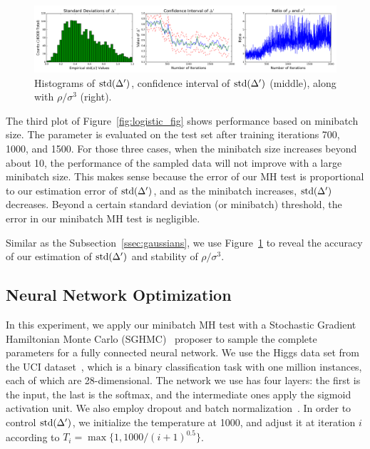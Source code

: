 \documentclass{article}
\begin{document}
\begin{figure}[t]
    \centering
    \includegraphics[width=1\linewidth]{CI_v02.png}
    \caption{
    Histograms of ${\rm std}(\Delta')$, confidence interval of ${\rm std}(\Delta')$ (middle), along with $\rho / \sigma^3$ (right).
    }
    \label{fig:exp_3}
\end{figure}

The third plot of Figure~\ref{fig:logistic_fig} shows performance based on minibatch size. The
parameter is evaluated on the test set after training iterations 700, 1000, and 1500. For those
three cases, when the minibatch size increases beyond about 10, the performance of the sampled data
will not improve with a large minibatch size. This makes sense because the error of our MH test is
proportional to our estimation error of ${\rm std}(\Delta')$, and as the minibatch increases, ${\rm
std}(\Delta')$ decreases. Beyond a certain standard deviation (or minibatch) threshold, the error in
our minibatch MH test is negligible.

Similar as the Subsection~\ref{ssec:gaussians}, we use Figure~\ref{fig:exp_3} to reveal the accuracy of our estimation of ${\rm std}(\Delta')$ and stability of $\rho/\sigma^3$.


\subsection{Neural Network Optimization}\label{ssec:nets}

In this experiment, we apply our minibatch MH test with a Stochastic Gradient Hamiltonian
Monte Carlo (SGHMC)~\cite{sghmc_2014} proposer to sample the complete parameters for a fully
connected neural network. We use the Higgs data set from the UCI dataset~\cite{Lichman:2013}, which
is a binary classification task with one million instances, each of which are 28-dimensional. The
network we use has four layers: the first is the input, the last is the softmax, and the
intermediate ones apply the sigmoid activation unit.  We also employ dropout and batch
normalization~\cite{icml2015_ioffe15}.  In order to control ${\rm std}(\Delta')$, we initialize the
temperature at 1000, and adjust it at iteration $i$ according to $T_i = \max\{1,
1000/(i+1)^{0.5}\}$.
\end{document}
